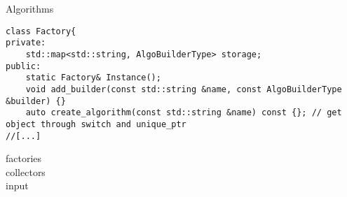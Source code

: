 


\begin{frame}[fragile] {Algorithms}

\begin{verbatim}
class Factory{
private:
    std::map<std::string, AlgoBuilderType> storage;
public:
    static Factory& Instance();
    void add_builder(const std::string &name, const AlgoBuilderType &builder) {}
    auto create_algorithm(const std::string &name) const {}; // get object through switch and unique_ptr
//[...]
\end{verbatim}


factories \\
collectors \\
input

\end{frame}

